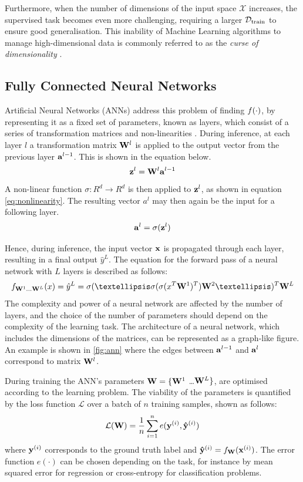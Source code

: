 	Furthermore, when the number of dimensions of the input space $\mathcal{X}$ increases, the supervised task becomes even more challenging, requiring a larger $\mathcal{D}_{\text{train}}$ to ensure good generalisation. This inability of Machine Learning algorithms to manage high-dimensional data is commonly referred to as the \textit{curse of dimensionality} \citep{rustUsingRandomizationBreak1997, aremuMachineLearningApproach2020, stuartrussellArtificialIntelligenceModern2022}.
	
\subsection{Fully Connected Neural Networks}
		Artificial Neural Networks (ANNs) address this problem of finding $f(\cdot)$, by representing it as a fixed set of parameters, known as layers, which consist of a series of transformation matrices and non-linearities \citep{jainArtificialNeuralNetworks1996, kroghWhatAreArtificial2008, zhangArtificialNeuralNetwork2018}. During inference, at each layer $l$ a transformation matrix $\mathbf{W}^l$ is applied to the output vector from the previous layer $\mathbf{a}^{l-1}$. This is shown in the equation below.
		$$ \mathbf{z}^l = \mathbf{W}^l \mathbf{a}^{l-1} $$
		A non-linear function $\sigma: R^d \rightarrow R^d$ is then applied to $\mathbf{z}^{l}$, as shown in equation \ref{eq:nonlinearity}. The resulting vector $a^l$ may then again be the input for a following layer.
		$$
			\mathbf{a}^l = \sigma(\mathbf{z}^{l})	\label{eq:nonlinearity}
		$$
		
		Hence, during inference, the input vector $\mathbf{x}$ is propagated through each layer, resulting in a final output $\hat{y}^L$. The equation for the forward pass of a neural network with $L$ layers is described as follows: 	
		$$
			f_{\W^1 \dots \W^L}(x) = \hat{y}^L = \sigma(… \sigma( \sigma( x^T \W^1 )^T) \W^2 …)^T \W^L \label{eq:forward_pass}
		$$
		The complexity and power of a neural network are affected by the number of layers, and the choice of the number of parameters should depend on the complexity of the learning task. The architecture of a neural network, which includes the dimensions of the matrices, can be represented as a graph-like figure. An example is shown in \ref{fig:ann} where the edges between $\mathbf{a}^{l-1}$ and $\mathbf{a}^{l}$ correspond to matrix $\mathbf{W}^l$.

		

	
		During training the ANN's parameters $\mathbf{W} = \{\mathbf{W}^1$ \dots $\mathbf{W}^L\}$, are optimised according to the learning problem. The viability of the parameters is quantified by the loss function $\mathcal{L}$ over a batch of $n$ training samples, shown as follows:
		$$
			\mathcal{L}(\mathbf{W}) = \frac{1}{n}\sum_{i=1}^n e(\mathbf{y}^{(i)}, \mathbf{\hat{y}}^{(i)}) \label{eq:generic_loss}
		$$
		where $\mathbf{y}^{(i)}$ corresponds to the ground truth label and $\mathbf{\hat{y}}^{(i)} = f_{\mathbf{W}}(\mathbf{x}^{(i)})$. The error function $e(\cdot)$ can be chosen depending on the task, for instance by mean squared error for regression or cross-entropy for classification problems.
		
